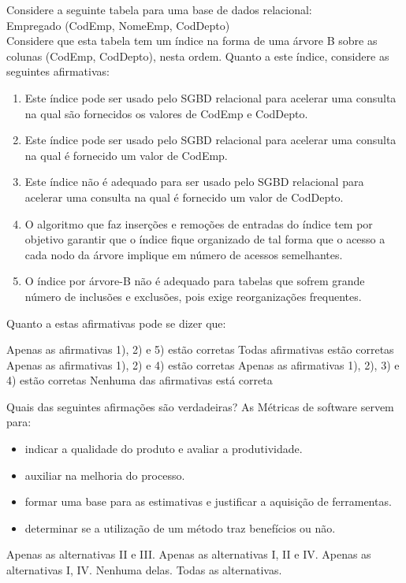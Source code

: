 \documentclass[12pt, addpoints]{exam}
\begin{document}
\begin{questions}
\question
Considere a seguinte tabela para uma base de dados relacional:\\
Empregado (CodEmp, NomeEmp, CodDepto)\\
Considere que esta tabela tem um índice na forma de uma árvore B sobre as colunas (CodEmp, CodDepto), nesta ordem.
Quanto a este índice, considere as seguintes afirmativas:
\begin{enumerate}
    \item Este índice pode ser usado pelo SGBD relacional para acelerar uma consulta na qual são fornecidos os valores de CodEmp e CodDepto.
    \item Este índice pode ser usado pelo SGBD relacional para acelerar uma consulta na qual é fornecido um valor de CodEmp.
    \item Este índice não é adequado para ser usado pelo SGBD relacional para acelerar uma consulta na qual é fornecido um valor de CodDepto.
    \item O algoritmo que faz inserções e remoções de entradas do índice tem por objetivo garantir que o índice fique organizado de tal forma que o acesso a cada nodo da árvore implique em número de acessos semelhantes.
    \item O índice por árvore-B não é adequado para tabelas que sofrem grande número de inclusões e exclusões, pois exige reorganizações frequentes.
\end{enumerate}


Quanto a estas afirmativas pode se dizer que:
\begin{choices}
\choice Apenas as afirmativas 1), 2) e 5) estão corretas
\choice Todas afirmativas estão corretas
\choice Apenas as afirmativas 1), 2) e 4) estão corretas
\choice Apenas as afirmativas 1), 2), 3) e 4) estão corretas
\choice Nenhuma das afirmativas está correta
\end{choices}

\question
Quais das seguintes afirmações são verdadeiras? As Métricas de software servem para:

\begin{itemize}
    \item[I)] indicar a qualidade do produto e avaliar a produtividade.
    \item[II)] auxiliar na melhoria do processo.
    \item[III)] formar uma base para as estimativas e justificar a aquisição de ferramentas.
    \item[IV)] determinar se a utilização de um método traz benefícios ou não.
\end{itemize}
\begin{choices}
\choice Apenas as alternativas II e III.
\choice Apenas as alternativas I, II e IV.
\choice Apenas as alternativas I, IV.
\choice Nenhuma delas.
\choice Todas as alternativas.
\end{choices}


\end{questions}
\end{document}
